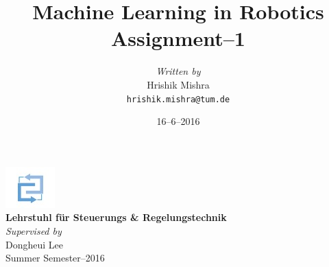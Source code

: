\documentclass[10pt,a4paper]{article}
\begin{document}
\begin{titlepage}
\title{\textbf{Machine Learning in Robotics}\\Assignment--1}
\date{16--6--2016}
\maketitle
\centering
\vspace{3cm}
\author{\textit{Written by}\\ Hrishik Mishra\\ 
\small{
\tt{hrishik.mishra@tum.de}}}

\vspace{3cm}
\includegraphics[scale=0.5]{ou_04}\\
\textbf{Lehrstuhl für Steuerungs \& Regelungstechnik}\\
\textit{Supervised by}\\{Dongheui Lee}\\
\vspace{2cm}
Summer Semester--2016
\end{titlepage}
\end{document}
